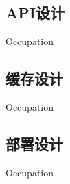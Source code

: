
\subsection{API设计}
\indent
Occupation

\subsection{缓存设计}
\indent
Occupation

\subsection{部署设计}
\indent
Occupation


\clearpage